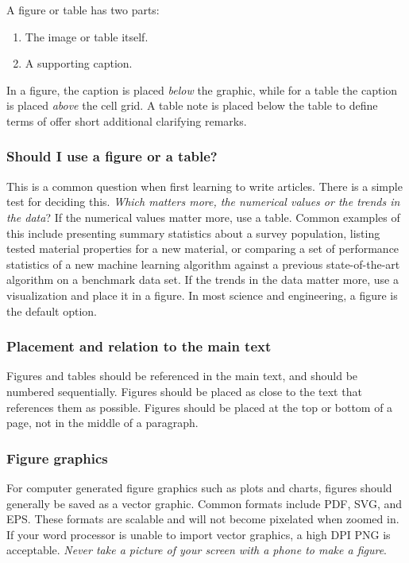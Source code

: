 \documentclass[]{article}
\begin{document}
A figure or table has two parts:
\begin{enumerate}
    \item The image or table itself.
    \item A supporting caption.
\end{enumerate}
In a figure, the caption is placed \emph{below} the graphic, while for a table the caption is placed \emph{above} the cell grid. A table note is placed below the table to define terms of offer short additional clarifying remarks.


\subsubsection{Should I use a figure or a table?}
This is a common question when first learning to write articles. There is a simple test for deciding this. \emph{Which matters more, the numerical values or the trends in the data}? If the numerical values matter more, use a table. Common examples of this include presenting summary statistics about a survey population, listing tested material properties for a new material, or comparing a set of performance statistics of a new machine learning algorithm against a previous state-of-the-art algorithm on a benchmark data set. If the trends in the data matter more, use a visualization and place it in a figure. In most science and engineering, a figure is the default option.

\subsubsection{Placement and relation to the main text}
Figures and tables should be referenced in the main text, and should be numbered sequentially. Figures should be placed as close to the text that references them as possible. Figures should be placed at the top or bottom of a page, not in the middle of a paragraph.

\subsubsection{Figure graphics}
For computer generated figure graphics such as plots and charts, figures should generally be saved as a vector graphic. Common formats include PDF, SVG, and EPS. These formats are scalable and will not become pixelated when zoomed in. If your word processor is unable to import vector graphics, a high DPI PNG is acceptable. \emph{Never take a picture of your screen with a phone to make a figure}.
\end{document}
